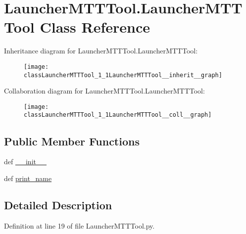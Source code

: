 \hypertarget{classLauncherMTTTool_1_1LauncherMTTTool}{\section{Launcher\-M\-T\-T\-Tool.\-Launcher\-M\-T\-T\-Tool Class Reference}
\label{classLauncherMTTTool_1_1LauncherMTTTool}
}


Inheritance diagram for Launcher\-M\-T\-T\-Tool.\-Launcher\-M\-T\-T\-Tool\-:\nopagebreak
\begin{figure}[H]
\begin{center}
\leavevmode
\texttt{[image: classLauncherMTTTool\_1\_1LauncherMTTTool\_\_inherit\_\_graph]}
\end{center}
\end{figure}


Collaboration diagram for Launcher\-M\-T\-T\-Tool.\-Launcher\-M\-T\-T\-Tool\-:\nopagebreak
\begin{figure}[H]
\begin{center}
\leavevmode
\texttt{[image: classLauncherMTTTool\_1\_1LauncherMTTTool\_\_coll\_\_graph]}
\end{center}
\end{figure}
\subsection*{Public Member Functions}
\begin{DoxyCompactItemize}
\item 
def \hyperlink{classLauncherMTTTool_1_1LauncherMTTTool_acfc089fc18fcde378ce794b64211d537}{\-\_\-\-\_\-init\-\_\-\-\_\-}
\item 
def \hyperlink{classLauncherMTTTool_1_1LauncherMTTTool_a07b353aff1a7768e40b46e67e47c9c21}{print\-\_\-name}
\end{DoxyCompactItemize}


\subsection{Detailed Description}


Definition at line 19 of file Launcher\-M\-T\-T\-Tool.\-py.



